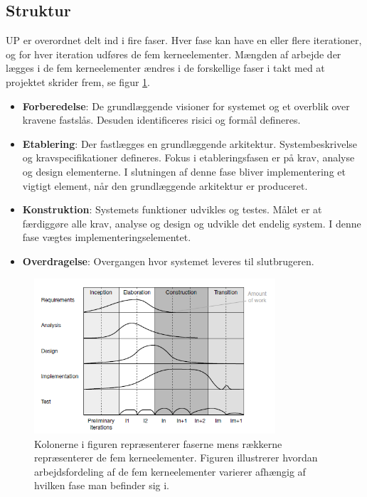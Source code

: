 \subsection{Struktur}
UP er overordnet delt ind i fire faser. Hver fase kan have en eller flere iterationer, og for hver iteration udføres de fem kerneelementer. Mængden af arbejde der lægges i de fem kerneelementer ændres i de forskellige faser i takt med at projektet skrider frem, se figur \ref{fig:UP}.
\begin{itemize}
    \item \textbf{Forberedelse}: De grundlæggende visioner for systemet og et overblik over kravene fastslås. Desuden identificeres risici og formål defineres. 
    \item \textbf{Etablering}: Der fastlægges en grundlæggende arkitektur. Systembeskrivelse og kravspecifikationer defineres. Fokus i etableringsfasen er på krav, analyse og design elementerne. I slutningen af denne fase bliver implementering et vigtigt element, når den grundlæggende arkitektur er produceret.  
    \item \textbf{Konstruktion}: Systemets funktioner udvikles og testes. Målet er at færdiggøre alle krav, analyse og design og udvikle det endelig system. I denne fase vægtes implementeringselementet. 
    \item \textbf{Overdragelse}: Overgangen hvor systemet leveres til slutbrugeren. 
\end{itemize}

\begin{figure}[H]
\centering
  \includegraphics[width=0.8\textwidth]{Billeder/UP.png}
   \caption{Kolonerne i figuren repræsenterer faserne mens rækkerne repræsenterer de fem kerneelementer. Figuren illustrerer hvordan arbejdsfordeling af de fem kerneelementer varierer afhængig af hvilken fase man befinder sig i. \cite{Arlow2002}} 
   \label{fig:UP}
\end{figure}


